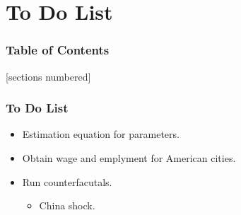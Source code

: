 \documentclass[serif, 9pt, aspectratio=32]{beamer}
\begin{document}
\section{To Do List}

\begin{frame}
    \frametitle{Table of Contents}
    [sections numbered]
    \tableofcontents[currentsection]
\end{frame}

\begin{frame}
    \centering
    \frametitle{To Do List}
    \begin{itemize}
        \setlength{\itemsep}{3em}
        \item Estimation equation for parameters.
        \item Obtain wage and emplyment for American cities.
        \item Run counterfacutals.
              \begin{itemize}
                  \item China shock.
              \end{itemize}
    \end{itemize}
\end{frame}
\end{document}
